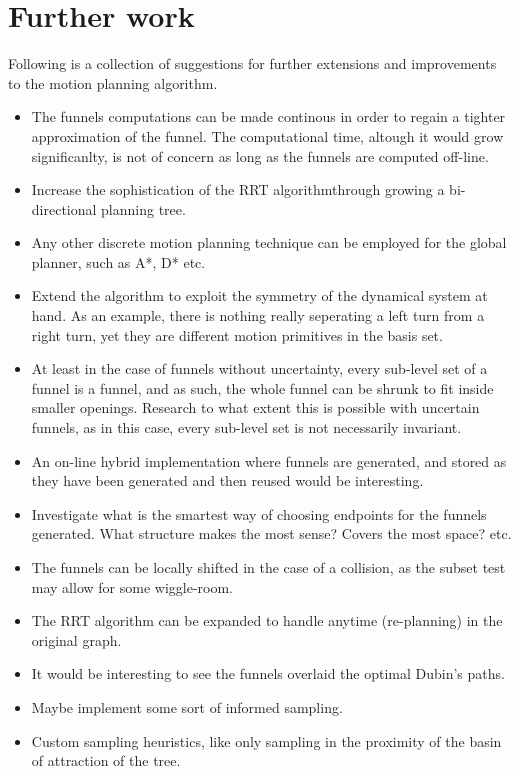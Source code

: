 \chapter{Further work}

Following is a collection of suggestions for further extensions and improvements
to the \rrtfunnel{} motion planning algorithm.

\begin{itemize}

\item The funnels computations can be made continous in order to regain a
  tighter approximation of the funnel. The computational time, altough it would
  grow significanlty, is not of concern as long as the funnels are computed
  off-line.

\item Increase the sophistication of the \ac{RRT} algorithm\ie through growing a
  bi-directional planning tree.
  
\item Any other discrete motion planning technique can be employed for the
  global planner, such as A*, D* etc.

\item Extend the algorithm to exploit the symmetry of the dynamical system at
  hand. As an example, there is nothing really seperating a left turn from a
  right turn, yet they are different motion primitives in the basis set.

\item At least in the case of funnels without uncertainty, every sub-level set
  of a funnel is a funnel, and as such, the whole funnel can be shrunk to fit
  inside smaller openings. Research to what extent this is possible with
  uncertain funnels, as in this case, every sub-level set is not necessarily
  invariant.

  \item An on-line hybrid implementation where funnels are generated, and stored
    as they have been generated and then reused would be interesting.

  \item  Investigate what is the smartest way of choosing endpoints for the
    funnels generated. What structure makes the most sense? Covers the most
    space? etc.

  \item The funnels can be locally shifted in the case of a collision, as the
    subset test may allow for some wiggle-room.

  \item The RRT algorithm can be expanded to handle anytime (re-planning) in the
    original graph.

  \item It would be interesting to see the funnels overlaid the optimal Dubin's paths.

  \item Maybe implement some sort of informed sampling.

  \item Custom sampling heuristics, like only sampling in the proximity of the
    basin of attraction of the tree.

\end{itemize}